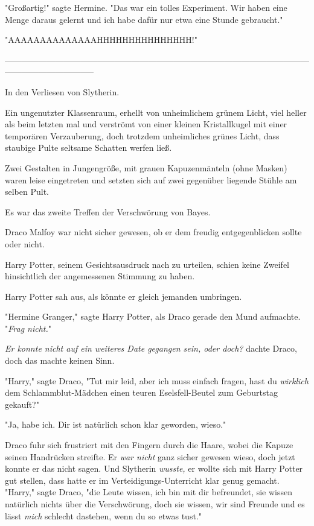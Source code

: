 {"Großartig!" sagte Hermine. "Das war ein tolles Experiment. Wir haben eine Menge daraus gelernt und ich habe dafür nur etwa eine Stunde gebraucht."

"AAAAAAAAAAAAAAHHHHHHHHHHHHHHH!"

--------------------------------------------------------------------------------------------------------------------------------------------

In den Verliesen von Slytherin.

Ein ungenutzter Klassenraum, erhellt von unheimlichem grünem Licht, viel heller als beim letzten mal und verströmt von einer kleinen Kristallkugel mit einer temporären Verzauberung, doch trotzdem unheimliches grünes Licht, dass staubige Pulte seltsame Schatten werfen ließ.

Zwei Gestalten in Jungengröße, mit grauen Kapuzenmänteln (ohne Masken) waren leise eingetreten und setzten sich auf zwei gegenüber liegende Stühle am selben Pult.

Es war das zweite Treffen der Verschwörung von Bayes.

Draco Malfoy war nicht sicher gewesen, ob er dem freudig entgegenblicken sollte oder nicht.

Harry Potter, seinem Gesichtsausdruck nach zu urteilen, schien keine Zweifel hinsichtlich der angemessenen Stimmung zu haben.

Harry Potter sah aus, als könnte er gleich jemanden umbringen.

"Hermine Granger," sagte Harry Potter, als Draco gerade den Mund aufmachte. "\emph{Frag nicht.}"

\emph{Er konnte nicht auf ein weiteres Date gegangen sein, oder doch?} dachte Draco, doch das machte keinen Sinn.

"Harry," sagte Draco, "Tut mir leid, aber ich muss einfach fragen, hast du \emph{wirklich} dem Schlammblut-Mädchen einen teuren Eselsfell-Beutel zum Geburtstag gekauft?"

"Ja, habe ich. Dir ist natürlich schon klar geworden, wieso."

Draco fuhr sich frustriert mit den Fingern durch die Haare, wobei die Kapuze seinen Handrücken streifte. Er \emph{war nicht} ganz sicher gewesen wieso, doch jetzt konnte er das nicht sagen. Und Slytherin \emph{wusste,} er wollte sich mit Harry Potter gut stellen, dass hatte er im Verteidigungs-Unterricht klar genug gemacht. "Harry," sagte Draco, "die Leute wissen, ich bin mit dir befreundet, sie wissen natürlich nichts über die Verschwörung, doch sie wissen, wir sind Freunde und es lässt \emph{mich} schlecht dastehen, wenn du so etwas tust."

}

